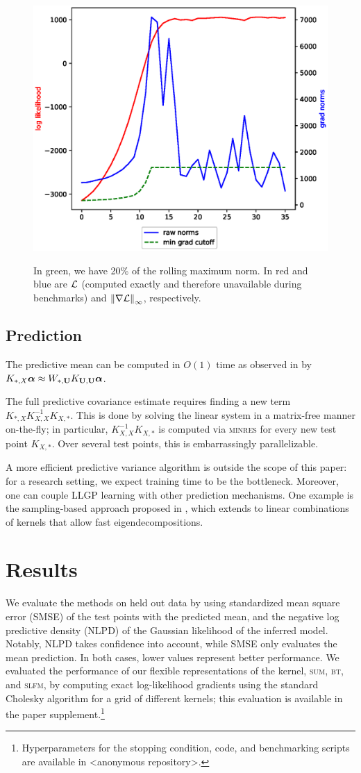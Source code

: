 \documentclass{article}
\begin{document}
\begin{figure}[!h]
\centering
{\includegraphics[width=0.5\columnwidth]{running_cutoff.eps}}
\caption{In green, we have 20\% of the rolling maximum norm. In red and blue are $\mathcal{L}$ (computed exactly and therefore unavailable during benchmarks) and $ \left\| \nabla\mathcal{L} \right\|_\infty $, respectively. }
\label{fx2007-stop}
\end{figure}

\subsection{Prediction}

The predictive mean can be computed in $O(1)$ time as observed in \cite{msgp} by $K_{*,X}{\boldsymbol\alpha}\approx W_{*,\textbf{U}}K_{\textbf{U},\textbf{U}}{\boldsymbol\alpha}$.

The full predictive covariance estimate requires finding a new term $K_{*,X}K_{X,X}^{-1}K_{X,*}$. This is done by solving the linear system in a matrix-free manner on-the-fly; in particular, $K_{X,X}^{-1}K_{X,*}$ is computed via \textsc{minres} for every new test point $K_{X,*}$. Over several test points, this is embarrassingly parallelizable.

A more efficient predictive variance algorithm is outside the scope of this paper: for a research setting, we expect training time to be the bottleneck. Moreover, one can couple LLGP learning with other prediction mechanisms. One example is the sampling-based approach proposed in \cite{papandreou2011efficient}, which extends to linear combinations of kernels that allow fast eigendecompositions.

\section{Results}
\label{sec:results}
We evaluate the methods on held out data by using standardized mean square error (SMSE) of the test points with the predicted mean, and the negative log predictive density (NLPD) of the Gaussian likelihood of the inferred model. Notably, NLPD takes confidence into account, while SMSE only evaluates the mean prediction. In both cases, lower values represent better performance. We evaluated the performance of our flexible representations of the kernel, \textsc{sum}, \textsc{bt}, and \textsc{slfm}, by computing exact log-likelihood gradients using the standard Cholesky algorithm for a grid of different kernels; this evaluation is available in the paper supplement.\footnote{Hyperparameters for the stopping condition, code, and benchmarking scripts are available in <anonymous repository>.}
\end{document}
